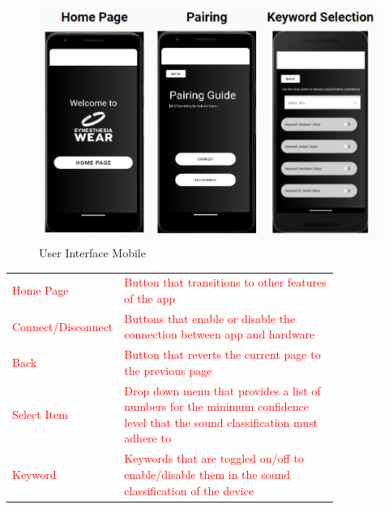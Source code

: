 \documentclass[12pt, titlepage]{article}
\begin{document}
\begin{figure}[H]
  \includegraphics[clip,width=\textwidth,height=\textheight,keepaspectratio]{UserInterface2.pdf}
  \caption{User Interface Mobile}
  \label{User Interface} 
\end{figure}
\begin{center}
  \begin{tabular}{l p{0.8\linewidth}}
  \textcolor{red}{Home Page} & \textcolor{red}{Button that transitions to other features of the app}  \\
  \textcolor{red}{Connect/Disconnect} & \textcolor{red}{Buttons that enable or disable the connection between app and hardware}  \\
  \textcolor{red}{Back} & \textcolor{red}{Button that reverts the current page to the previous page}  \\
  \textcolor{red}{Select Item} & \textcolor{red}{Drop down menu that provides a list of numbers for the minimum confidence level that the sound classification must adhere to}  \\
  \textcolor{red}{Keyword} & \textcolor{red}{Keywords that are toggled on/off to enable/disable them in the sound classification of the device}  \\
\end{tabular}
\end{center}
\newpage
\end{document}
